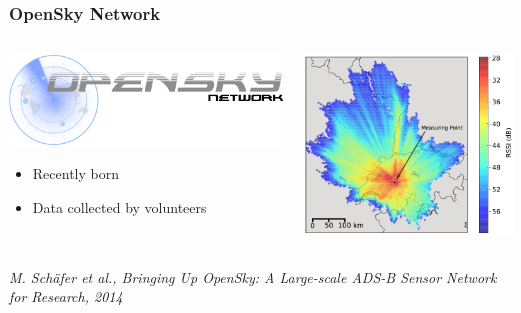 \documentclass{beamer}
\begin{document}
    \begin{frame}
        \frametitle{OpenSky Network}
        \begin{columns}
            \begin{column}{0.5\textwidth}
                \includegraphics[width=\linewidth]{img/opensky-logo}
                \vspace*{3mm}
                \begin{itemize}
                    \item Recently born
                    \item Data collected by volunteers                    
                \end{itemize}
            \end{column}
            \begin{column}{0.5\textwidth}
                \includegraphics[width=\linewidth]{img/signal-intensity}
            \end{column}
        \end{columns}
        \vspace*{10mm}
        \textit{M. Schäfer et al., Bringing Up OpenSky: A Large-scale ADS-B Sensor Network for Research, 2014}
    \end{frame}
\end{document}
